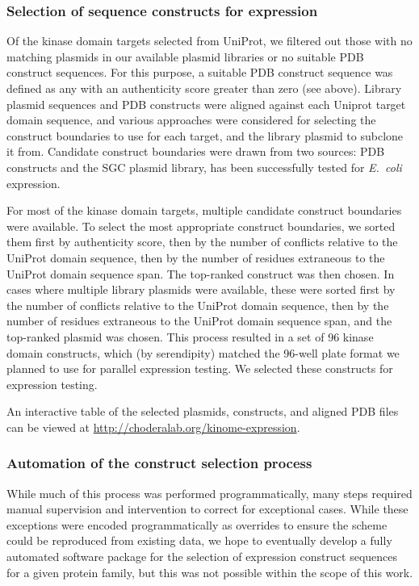 \documentclass[phd,tocprelim]{cornell}
\begin{document}
\subsubsection{Selection of sequence constructs for expression}

Of the kinase domain targets selected from UniProt, we filtered out those with no matching plasmids in our available plasmid libraries or no suitable PDB construct sequences.
For this purpose, a suitable PDB construct sequence was defined as any with an authenticity score greater than zero (see above). 
Library plasmid sequences and PDB constructs were aligned against each Uniprot target domain sequence, and various approaches were considered for selecting the construct boundaries to use for each target, and the library plasmid to subclone it from.
Candidate construct boundaries were drawn from two sources: PDB constructs and the SGC plasmid library, has been successfully tested for \emph{E.~coli} expression.

For most of the kinase domain targets, multiple candidate construct boundaries were available.
To select the most appropriate construct boundaries, we sorted them first by authenticity score, then by the number of conflicts relative to the UniProt domain sequence, then by the number of residues extraneous to the UniProt domain sequence span.
The top-ranked construct was then chosen.
In cases where multiple library plasmids were available, these were sorted first by the number of conflicts relative to the UniProt domain sequence, then by the number of residues extraneous to the UniProt domain sequence span, and the top-ranked plasmid was chosen.
This process resulted in a set of 96 kinase domain constructs, which (by serendipity) matched the 96-well plate format we planned to use for parallel expression testing.
We selected these constructs for expression testing.

An interactive table of the selected plasmids, constructs, and aligned PDB files can be viewed at \url{http://choderalab.org/kinome-expression}.

\subsubsection{Automation of the construct selection process}

While much of this process was performed programmatically, many steps required manual supervision and intervention to correct for exceptional cases.
While these exceptions were encoded programmatically as overrides to ensure the scheme could be reproduced from existing data, we hope to eventually develop a fully automated software package for the selection of expression construct sequences for a given protein family, but this was not possible within the scope of this work.
\end{document}
